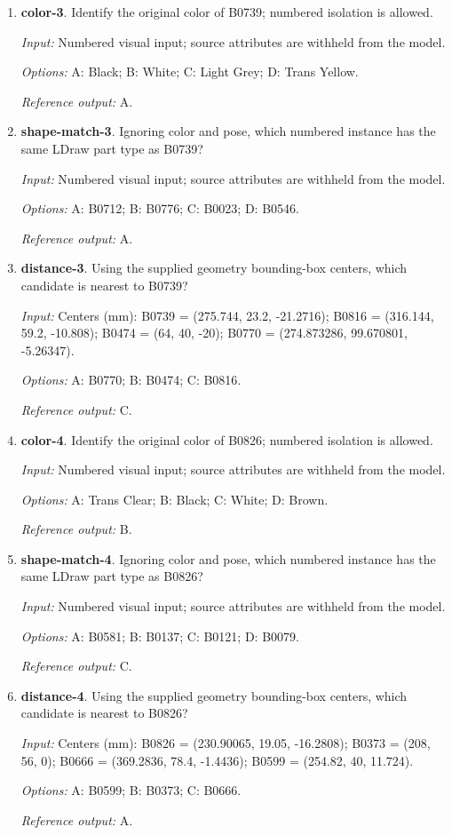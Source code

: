 \begin{enumerate}
\item \textbf{color-3}. Identify the original color of B0739; numbered isolation is allowed.\par {\small \textit{Input:} Numbered visual input; source attributes are withheld from the model. \par\textit{Options:} A: Black; B: White; C: Light Grey; D: Trans Yellow. \par\textit{Reference output:} A.}
\item \textbf{shape-match-3}. Ignoring color and pose, which numbered instance has the same LDraw part type as B0739?\par {\small \textit{Input:} Numbered visual input; source attributes are withheld from the model. \par\textit{Options:} A: B0712; B: B0776; C: B0023; D: B0546. \par\textit{Reference output:} A.}
\item \textbf{distance-3}. Using the supplied geometry bounding-box centers, which candidate is nearest to B0739?\par {\small \textit{Input:} Centers (mm): B0739 = (275.744, 23.2, -21.2716); B0816 = (316.144, 59.2, -10.808); B0474 = (64, 40, -20); B0770 = (274.873286, 99.670801, -5.26347). \par\textit{Options:} A: B0770; B: B0474; C: B0816. \par\textit{Reference output:} C.}
\item \textbf{color-4}. Identify the original color of B0826; numbered isolation is allowed.\par {\small \textit{Input:} Numbered visual input; source attributes are withheld from the model. \par\textit{Options:} A: Trans Clear; B: Black; C: White; D: Brown. \par\textit{Reference output:} B.}
\item \textbf{shape-match-4}. Ignoring color and pose, which numbered instance has the same LDraw part type as B0826?\par {\small \textit{Input:} Numbered visual input; source attributes are withheld from the model. \par\textit{Options:} A: B0581; B: B0137; C: B0121; D: B0079. \par\textit{Reference output:} C.}
\item \textbf{distance-4}. Using the supplied geometry bounding-box centers, which candidate is nearest to B0826?\par {\small \textit{Input:} Centers (mm): B0826 = (230.90065, 19.05, -16.2808); B0373 = (208, 56, 0); B0666 = (369.2836, 78.4, -1.4436); B0599 = (254.82, 40, 11.724). \par\textit{Options:} A: B0599; B: B0373; C: B0666. \par\textit{Reference output:} A.}

\end{enumerate}
